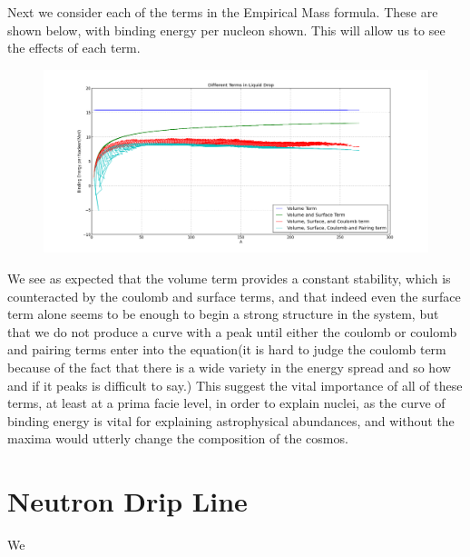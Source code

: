 \documentclass[11pt]{article} %
\begin{document}
Next we consider each of the terms in the Empirical Mass formula. These are shown below, with binding energy per nucleon shown. 
This will allow us to see the effects of each term. 


\vspace{1mm}
\begin{figure}[h]
\centering
\includegraphics[width=\linewidth]{"LiquidDropTerms"}
\end{figure}
\vspace{1mm}

We see as expected that the volume term provides a constant stability, which is counteracted by the coulomb and surface terms, and that indeed even the surface term alone seems to be enough to begin a strong structure in the system, but that we do not produce a curve with a peak until either the coulomb or coulomb and pairing terms enter into the equation(it is hard to judge the coulomb term because of the fact that there is a wide variety in the energy spread and so how and if it peaks is difficult to say.) This suggest the vital importance of all of these terms, at least at a prima facie level, in order to explain nuclei, as  the curve of binding energy is vital for explaining astrophysical abundances, and without the maxima would utterly change the composition of the cosmos.\\


\section{Neutron Drip Line}

We 
\end{document}
